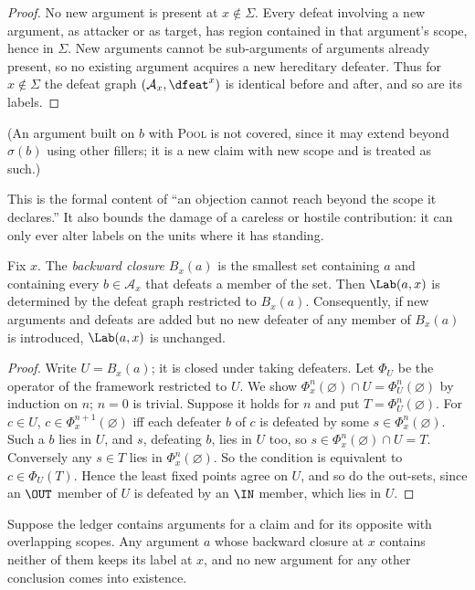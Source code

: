 \begin{proof}
No new argument is present at $x\notin\Sigma$. Every defeat involving a new argument, as attacker or as target, has region contained in that argument's scope, hence in $\Sigma$. New arguments cannot be sub-arguments of arguments already present, so no existing argument acquires a new hereditary defeater. Thus for $x\notin\Sigma$ the defeat graph $(\mathcal A_x,\dfeat^x)$ is identical before and after, and so are its labels.
\end{proof}

(An argument built on $b$ with \textsc{Pool} is not covered, since it may extend beyond $\sigma(b)$ using other fillers; it is a new claim with new scope and is treated as such.)

This is the formal content of ``an objection cannot reach beyond the scope it declares.'' It also bounds the damage of a careless or hostile contribution: it can only ever alter labels on the units where it has standing.

\begin{theorem}\label{thm:direction}
Fix $x$. The \emph{backward closure} $B_x(a)$ is the smallest set containing $a$ and containing every $b\in\mathcal A_x$ that defeats a member of the set. Then $\Lab(a,x)$ is determined by the defeat graph restricted to $B_x(a)$. Consequently, if new arguments and defeats are added but no new defeater of any member of $B_x(a)$ is introduced, $\Lab(a,x)$ is unchanged.
\end{theorem}

\begin{proof}
Write $U=B_x(a)$; it is closed under taking defeaters. Let $\Phi_U$ be the operator of the framework restricted to $U$. We show $\Phi_x^n(\varnothing)\cap U=\Phi_U^n(\varnothing)$ by induction on $n$; $n=0$ is trivial. Suppose it holds for $n$ and put $T=\Phi_U^n(\varnothing)$. For $c\in U$, $c\in\Phi_x^{n+1}(\varnothing)$ iff each defeater $b$ of $c$ is defeated by some $s\in\Phi_x^n(\varnothing)$. Such a $b$ lies in $U$, and $s$, defeating $b$, lies in $U$ too, so $s\in\Phi_x^n(\varnothing)\cap U=T$. Conversely any $s\in T$ lies in $\Phi_x^n(\varnothing)$. So the condition is equivalent to $c\in\Phi_U(T)$. Hence the least fixed points agree on $U$, and so do the out-sets, since an $\OUT$ member of $U$ is defeated by an $\IN$ member, which lies in $U$.
\end{proof}

\begin{corollary}\label{cor:explosion}
Suppose the ledger contains arguments for a claim and for its opposite with overlapping scopes. Any argument $a$ whose backward closure at $x$ contains neither of them keeps its label at $x$, and no new argument for any other conclusion comes into existence.
\end{corollary}

